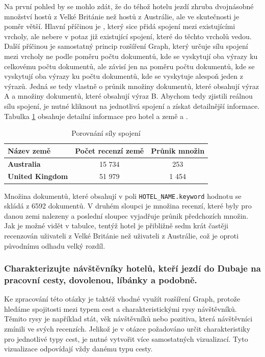 \documentclass[czech,BP]{thesiskiv}
\begin{document}
 Na první pohled by se mohlo zdát, že do téhož hotelu jezdí zhruba dvojnásobné množství hostů z Velké Británie než hostů z Austrálie, ale ve skutečnosti je poměr větší. Hlavní příčinou je , který sice přidá spojení mezi existujícími vrcholy, ale nebere v potaz již existující spojení, které do těchto vrcholů vedou. Další příčinou je samostatný princip rozšíření Graph, který určuje sílu spojení mezi vrcholy ne podle poměru počtu dokumentů, kde se vyskytují oba výrazy ku celkovému počtu dokumentů, ale závisí jen na poměru počtu dokumentů, kde se vyskytují oba výrazy ku počtu dokumentů, kde se vyskytuje alespoň jeden z výrazů. Jedná se tedy vlastně o průnik množiny dokumentů, které obsahují výraz A a množiny dokumentů, které obsahují výraz B. Abychom tedy zjistili reálnou sílu spojení, je nutné kliknout na jednotlivá spojení a získat detailnější informace. Tabulka \ref{sila spojeni} obsahuje detailní informace pro hotel  a země  a .
\begin{table}[htbp]
	\centering
	\begin{tabular}{l|c c}
		
		\textbf{Název země}     & \multicolumn{1}{l}{\textbf{Počet recenzí země}} & \multicolumn{1}{l|}{\textbf{Průnik množin}} \\ \hline
		\textbf{Australia}      & 15 734                                           & 253                                         \\ 
		\textbf{United Kingdom} & 51 979                                           & 1 454                                       \\ 
	\end{tabular}
	\caption{Porovnání síly spojení}
	\label{sila spojeni}
\end{table}


Množina dokumentů, které obsahují v poli \texttt{HOTEL\_NAME.keyword} hodnotu  se skládá z 6592 dokumentů. V druhém sloupci je množina recenzí, které byly pro danou zemi nalezeny a poslední sloupec vyjadřuje průnik předchozích množin. Jak je možné vidět v tabulce, tentýž hotel je přibližně sedm krát častěji recenzován uživateli z Velké Británie než uživateli z Austrálie, což je oproti původnímu odhadu velký rozdíl.

\subsubsection{Charakterizujte návštěvníky hotelů, kteří jezdí do Dubaje na pracovní cesty, dovolenou, líbánky a podobně.}
\label{subsub:Charakteristika návštěvníků}
Ke zpracování této otázky je taktéž vhodné využít rozšíření Graph, protože hledáme spojitosti mezi typem cest a charakteristickými rysy návštěvníků. Těmito rysy je například stát, věk návštěvníků nebo pozitiva, která návštěvníci zmínili ve svých recenzích. Jelikož je v otázce požadováno určit charakteristiky pro jednotlivé typy cest, je nutné vytvořit více samostatných vizualizací. Tyto vizualizace odpovídají vždy danému typu cesty.
\end{document}
